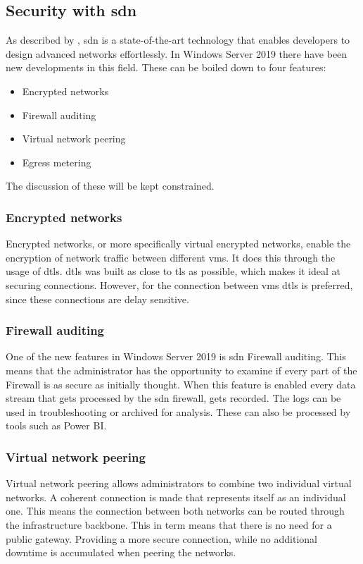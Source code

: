 \subsection{Security with \acrshort{sdn}}
\label{encrypted-networks}
\label{sdn}
As described by \textcite{Shin2016}, \acrshort{sdn} is a state-of-the-art technology that enables developers to design advanced networks effortlessly. In Windows Server 2019 there have been new developments in this field. These can be boiled down to four features: 
\begin{itemize}
	\item Encrypted networks
	\item Firewall auditing
	\item Virtual network peering
	\item Egress metering
\end{itemize} 
The discussion of these will be kept constrained.
\subsubsection{Encrypted networks}
Encrypted networks, or more specifically virtual encrypted networks, enable the encryption of network traffic between different \acrshort{vm}s. It does this through the usage of \acrfull{dtls}. \acrshort{dtls} was built as close to \acrfull{tls} as possible, which makes it ideal at securing connections. However, for the connection between \acrshort{vm}s \acrshort{dtls} is preferred, since these connections are delay sensitive.\autocite{Modadugu2004}

\subsubsection{Firewall auditing}
One of the new features in Windows Server 2019 is \acrshort{sdn} Firewall auditing. This means that the administrator has the opportunity to examine if every part of the Firewall is as secure as initially thought. When this feature is enabled every data stream that gets processed by the \acrshort{sdn} firewall, gets recorded. The logs can be used in troubleshooting or archived for analysis. These can also be processed by tools such as Power BI.

\subsubsection{Virtual network peering}
Virtual network peering allows administrators to combine two individual virtual networks. A coherent connection is made that represents itself as an individual one. This means the connection between both networks can be routed through the infrastructure backbone. This in term means that there is no need for a public gateway. Providing a more secure connection, while no additional downtime is accumulated when peering the networks.

